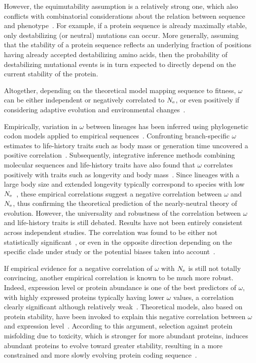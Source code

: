 \documentclass{article}
\begin{document}
However, the equimutability assumption is a relatively strong one, which also conflicts with combinatorial considerations about the relation between sequence and phenotype~\citep{Serohijos2012}.
For example, if a protein sequence is already maximally stable, only destabilizing (or neutral) mutations can occur.
More generally, assuming that the stability of a protein sequence reflects an underlying fraction of positions having already accepted destabilizing amino acids, then the probability of destabilizing mutational events is in turn expected to directly depend on the current stability of the protein.

Altogether, depending on the theoretical model mapping sequence to fitness, $\omega$ can be either independent or negatively correlated to $N_{\text{e}}$, or even positively if considering adaptive evolution and environmental changes~\citep{Lanfear2014}.

Empirically, variation in $\omega$ between lineages has been inferred using phylogenetic {codon} models applied to empirical sequences~\citep{Yang1998,Zhang2004}.
Confronting branch-specific $\omega$ estimates to life-history traits such as body mass or generation time uncovered a positive correlation~\citep{Popadin2007, Nikolaev2007}.
Subsequently, integrative inference methods combining molecular sequences and life-history traits have also found that $\omega$ correlates positively with traits such as longevity and body mass~\citep{Lartillot2011, Figuet2017}.
Since lineages with a large body size and extended longevity typically correspond to species with low $N_{\text{e}}$~\citep{Romiguier2014}, these empirical correlations suggest a negative correlation between $\omega$ and $N_{\text{e}}$, thus confirming the theoretical prediction of the {nearly-neutral} theory of evolution.
However, the universality and robustness of the correlation between $\omega$ and life-history traits is still debated.
Results have not been entirely consistent across independent studies. The correlation was found to be either not statistically significant~\citep{Lartillot2012}, or even in the opposite direction depending on the specific clade under study or the potential biases taken into account~\citep{Lanfear2010, Nabholz2013, Lanfear2014, Figuet2016}.

If empirical evidence for a negative correlation of $\omega$ with $N_{\text{e}}$ is still not totally convincing, another empirical correlation is known to be much more robust.
Indeed, expression level or protein abundance is one of the best predictors of $\omega$, with highly expressed proteins typically having lower $\omega$ values, a correlation clearly significant although relatively weak~\citep{Duret2000, Rocha2004, Drummond2005a, Zhang2015, Song2017}.
Theoretical models, also based on protein stability, have been invoked to explain this negative correlation between $\omega$ and expression level~\citep{Wilke2006, Drummond2008}.
According to this argument, selection against protein misfolding due to toxicity, which is stronger for more abundant proteins, induces abundant proteins to evolve toward greater stability, resulting in a more constrained and more slowly evolving protein coding sequence~\citep{Serohijos2012}.
\end{document}

